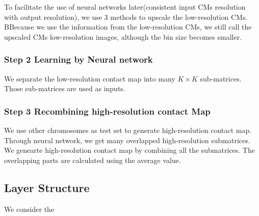 \documentclass[a4paper,12pt]{article}
\begin{document}
To facilitate the use of neural networks later(consistent input CMs resolution with output resolution), we use 3 methods to upscale the low-resolution CMs. BBecause we use the information from the low-resolution CMs, we still call the upscaled CMs low-resolution images, although the bin size becomes smaller.

\subsubsection*{Step 2 Learning by Neural network}
We separate the low-resolution contact map into many $K \times K$ sub-matrices. 
Those sub-matrices are used as inputs.


\subsubsection*{Step 3 Recombining high-resolution contact Map}
We use other chromosomes as test set to generate high-resolution contact map. Through neural network, we get many overlapped high-resolution submatrices. We genearte high-resolution contact map by combining all the submatrices. The overlapping parts are calculated using the average value.

\subsection{Layer Structure}
We consider the 






\end{document}
